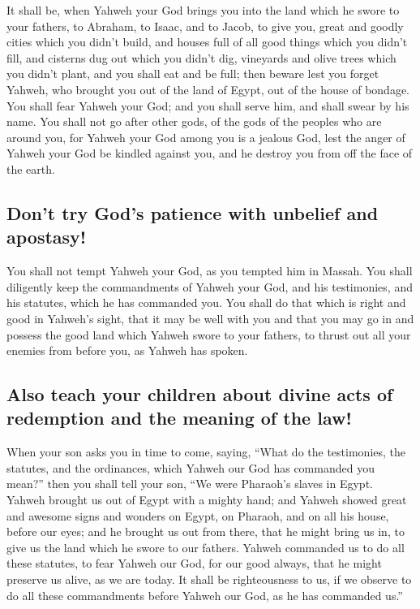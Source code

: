  It shall be, when Yahweh your God brings you into the
land which he swore to your fathers, to Abraham, to Isaac, and to Jacob,
to give you, great and goodly cities which you didn't build,
 and houses full of all good things which you didn't
fill, and cisterns dug out which you didn't dig, vineyards and olive
trees which you didn't plant, and you shall eat and be full;
 then beware lest you forget Yahweh, who brought you out
of the land of Egypt, out of the house of bondage.  You
shall fear Yahweh your God; and you shall serve him, and shall swear by
his name.  You shall not go after other gods, of the gods
of the peoples who are around you,  for Yahweh your God
among you is a jealous God, lest the anger of Yahweh your God be kindled
against you, and he destroy you from off the face of the earth.

\hypertarget{dont-try-gods-patience-with-unbelief-and-apostasy}{%
\subsection{Don't try God's patience with unbelief and
apostasy!}\label{dont-try-gods-patience-with-unbelief-and-apostasy}}

 You shall not tempt Yahweh your God, as you tempted him
in Massah.  You shall diligently keep the commandments of
Yahweh your God, and his testimonies, and his statutes, which he has
commanded you.  You shall do that which is right and good
in Yahweh's sight, that it may be well with you and that you may go in
and possess the good land which Yahweh swore to your fathers,
 to thrust out all your enemies from before you, as
Yahweh has spoken.

\hypertarget{also-teach-your-children-about-divine-acts-of-redemption-and-the-meaning-of-the-law}{%
\subsection{Also teach your children about divine acts of redemption and
the meaning of the
law!}\label{also-teach-your-children-about-divine-acts-of-redemption-and-the-meaning-of-the-law}}

 When your son asks you in time to come, saying, ``What
do the testimonies, the statutes, and the ordinances, which Yahweh our
God has commanded you mean?''  then you shall tell your
son, ``We were Pharaoh's slaves in Egypt. Yahweh brought us out of Egypt
with a mighty hand;  and Yahweh showed great and awesome
signs and wonders on Egypt, on Pharaoh, and on all his house, before our
eyes;  and he brought us out from there, that he might
bring us in, to give us the land which he swore to our fathers.
 Yahweh commanded us to do all these statutes, to fear
Yahweh our God, for our good always, that he might preserve us alive, as
we are today.  It shall be righteousness to us, if we
observe to do all these commandments before Yahweh our God, as he has
commanded us.''

